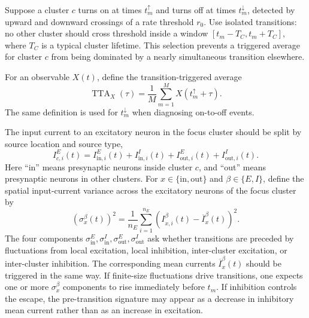 Suppose a cluster \(c\) turns on at times \(t_m^\uparrow\) and turns off at
times \(t_m^\downarrow\), detected by upward and downward crossings of a rate
threshold \(r_0\). Use isolated transitions: no other cluster should cross
threshold inside a window
\([t_m-T_C,t_m+T_C]\), where \(T_C\) is a typical cluster lifetime. This
selection prevents a triggered average for cluster \(c\) from being dominated
by a nearly simultaneous transition elsewhere.

For an observable \(X(t)\), define the transition-triggered average
\begin{equation}
    \operatorname{TTA}_X(\tau)
    =
    \frac{1}{M}
    \sum_{m=1}^{M}
    X(t_m^\uparrow+\tau).
    \label{eq:ch09-tta}
\end{equation}
The same definition is used for \(t_m^\downarrow\) when diagnosing on-to-off
events.

The input current to an excitatory neuron in the focus cluster should be split
by source location and source type,
\begin{equation}
    I_{c,i}^{E}(t)
    =
    I_{\mathrm{in},i}^{E}(t)
    +
    I_{\mathrm{in},i}^{I}(t)
    +
    I_{\mathrm{out},i}^{E}(t)
    +
    I_{\mathrm{out},i}^{I}(t).
    \label{eq:ch09-input-split}
\end{equation}
Here ``in'' means presynaptic neurons inside cluster \(c\), and ``out'' means
presynaptic neurons in other clusters. For \(x\in\{\mathrm{in},\mathrm{out}\}\)
and \(\beta\in\{E,I\}\), define the spatial input-current variance across the
excitatory neurons of the focus cluster by
\begin{equation}
    \left(\sigma_x^\beta(t)\right)^2
    =
    \frac{1}{n_E}
    \sum_{i=1}^{n_E}
    \left(
        I_{x,i}^{\beta}(t)
        -
        \overline I_x^\beta(t)
    \right)^2 .
    \label{eq:ch09-sigma-components}
\end{equation}
The four components
\(\sigma_{\mathrm{in}}^E,\sigma_{\mathrm{in}}^I,
\sigma_{\mathrm{out}}^E,\sigma_{\mathrm{out}}^I\) ask whether transitions are
preceded by fluctuations from local excitation, local inhibition,
inter-cluster excitation, or inter-cluster inhibition. The corresponding mean
currents \(\overline I_x^\beta(t)\) should be triggered in the same way. If
finite-size fluctuations drive transitions, one expects one or more
\(\sigma_x^\beta\) components to rise immediately before \(t_m\). If inhibition
controls the escape, the pre-transition signature may appear as a decrease in
inhibitory mean current rather than as an increase in excitation.

